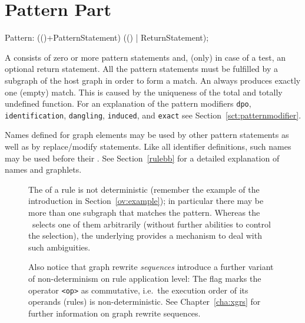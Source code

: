 \section{Pattern Part}
\label{patternpart}
\begin{rail}
  Pattern: (()+PatternStatement) (() | ReturnStatement);
\end{rail}
A  consists of zero or more pattern statements and, (only) in case of a test, an optional return statement.
All the pattern statements must be fulfilled by a subgraph of the host graph in order to form a match. 
An  always produces exactly one (empty) match. 
This is caused by the uniqueness of the total and totally undefined function.
For an explanation of the pattern modifiers \texttt{dpo}, \texttt{identification}, \texttt{dangling}, \texttt{induced}, and \texttt{exact} see Section~\ref{sct:patternmodifier}.

Names defined for graph elements may be used by other pattern statements as well as by replace/modify statements. 
Like all identifier definitions, such names may be used before their . 
See Section~\ref{rulebb} for a detailed explanation of names and graphlets.
\begin{figure}[htbp]
\begin{note}
\label{note:indeterminism}
The  of a rule is not deterministic (remember the example of the introduction in Section~\ref{ov:example}); in particular there may be more than one subgraph that matches the pattern. 
Whereas the \GrShell\ selects one of them arbitrarily (without further abilities to control the selection), the underlying \LibGr{} provides a mechanism to deal with such ambiguities. 

Also notice that graph rewrite \emph{sequences} introduce a further variant of non-determinism on rule application level: 
The  flag marks the operator \texttt{<op>} as commutative, i.e.\ the execution order of its operands (rules) is non-deterministic. 
See Chapter~\ref{cha:xgrs} for further information on graph rewrite sequences.
\end{note}
\end{figure}

